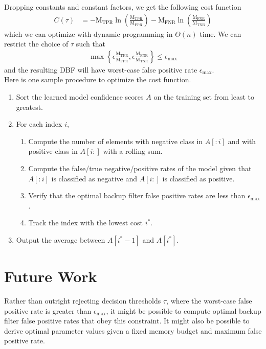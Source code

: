 \documentclass{article}
\begin{document}
\noindent
Dropping constants and constant factors, we get the following cost function
\begin{align*}
    C(\tau) &= -\text{M}_\text{TPR} \ln \left( \frac{\text{M}_\text{TPR}}{\text{M}_\text{FPR}} \right) 
 - \text{M}_\text{FNR} \ln \left( \frac{\text{M}_\text{FNR}}{\text{M}_\text{TNR}}\right)
\end{align*}
which we can optimize with dynamic programming in $\Theta(n)$ time. We can restrict the choice of $\tau$ such that 
\begin{align}
    \max\left\{\epsilon\frac{\text{M}_\text{TPR}}{\text{M}_\text{FPR}}, \epsilon \frac{\text{M}_\text{FNR}}{\text{M}_\text{TNR}} \right\} \leq \epsilon_\text{max}
\end{align}
and the resulting DBF will have worst-case false positive rate $\epsilon_\text{max}$. \\

\noindent
Here is one sample procedure to optimize the cost function.
\begin{enumerate}
    \item Sort the learned model confidence scores $A$ on the training set from least to greatest.
    \item For each index $i$,
    \begin{enumerate}
        \item Compute the number of elements with negative class in $A[:i]$ and with positive class in $A[i:]$ with a rolling sum. 
        \item Compute the false/true negative/positive rates of the model given that $A[:i]$ is classified as negative and $A[i:]$ is classified as positive.
        \item Verify that the optimal backup filter false positive rates are less than $\epsilon_\text{max}$.
        \item Track the index with the lowest cost $i^*$.
    \end{enumerate}
    \item Output the average between $A[i^* - 1]$ and $A[i^*]$.
\end{enumerate}

\section{Future Work}

Rather than outright rejecting decision thresholds $\tau$, where the worst-case false positive rate is greater than $\epsilon_\text{max}$, it might be possible to compute optimal backup filter false positive rates that obey this constraint. It might also be possible to derive optimal parameter values given a fixed memory budget and maximum false positive rate. 

\printbibliography
\end{document}
